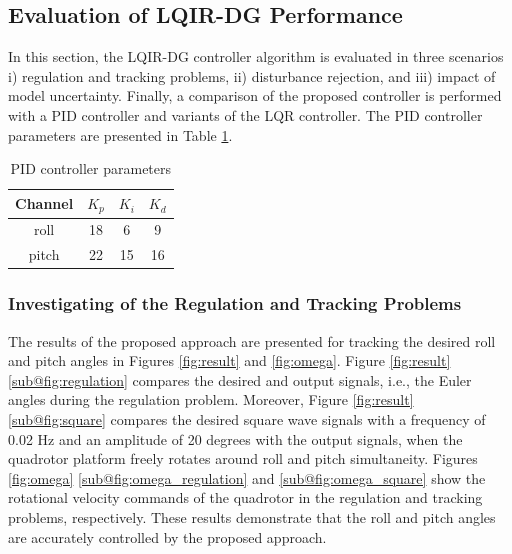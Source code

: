 \documentclass[3p]{elsarticle}
\begin{document}
\subsection{Evaluation of LQIR-DG Performance}
\noindent In this section, the LQIR-DG controller algorithm is evaluated in three scenarios i) regulation and tracking problems, ii) disturbance rejection, and iii) impact of model uncertainty.
Finally, a comparison of the proposed controller is performed with a PID controller and variants of the LQR controller. 
The PID controller parameters are presented in Table \ref{tab:PID_parameters}.
\begin{table}[H]
	\renewcommand{\arraystretch}{1.3}
	\caption{PID controller parameters}
	\vspace{-0.5cm}
	\begin{center}
		\begin{tabular}{cccc}
		\hline
		\textbf{Channel} & \textbf{$K_p$} & \textbf{$K_i$} & \textbf{$K_d$} \\
		\hline
		roll & 18 & 6 & 9 \\
		pitch & 22 & 15 & 16 \\
		\hline
		\end{tabular}
		\label{tab:PID_parameters}
	\end{center}
\end{table}
\subsubsection{Investigating of the Regulation and Tracking Problems}\label{sec:regulation}
\noindent The results of the proposed approach are presented for tracking the desired roll and pitch angles in Figures \ref{fig:result} and \ref{fig:omega}.
Figure \ref{fig:result} \ref{sub@fig:regulation} compares the desired and output signals, i.e., the Euler angles during the regulation problem. Moreover, Figure \ref{fig:result} \ref{sub@fig:square} compares the desired square wave signals with a frequency of 0.02 Hz and an amplitude of 20 degrees with the output signals, when the quadrotor platform freely rotates around roll and pitch simultaneity.
Figures \ref{fig:omega} \ref{sub@fig:omega_regulation} and \ref{sub@fig:omega_square} show the rotational velocity commands of the quadrotor in the regulation and tracking problems, respectively. These results demonstrate that the roll and pitch angles are accurately controlled by the proposed approach.
\end{document}

